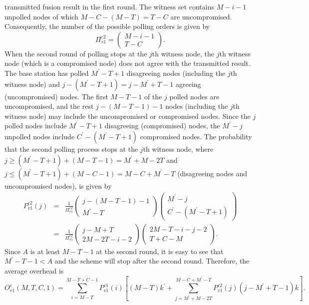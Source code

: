 \documentclass[12pt, onecolumn, draftcls]{IEEEtran}
\begin{document}
transmitted fusion result in the first round. The witness set
contains $M-i-1$ unpolled nodes of which $M-C-(M-T)=T-C$ are
uncompromised. Consequently, the number of the possible polling
orders is given by
\[
\Pi_{v1}^{c2} = \left(\begin{array}{c} M-i-1 \\ T-C
\end{array}\right).
\]
When the second round of polling stops at the $j$th witness node,
the $j$th witness node (which is a compromised node) does not agree
with the transmitted result. The base station has polled
$M^{\prime}-T+1$ disagreeing nodes (including the $j$th witness
node) and $j-(M^{\prime}-T+1)=j-M^{\prime}+T-1$ agreeing
(uncompromised) nodes. The first $M-T-1$ of the $j$ polled nodes are
uncompromised, and the rest $j-(M-T-1)-1$ nodes (including the $j$th
witness node) may include the uncompromised or compromised nodes.
Since the $j$ polled nodes include $M^{\prime}-T+1$ disagreeing
(compromised) nodes, the $M^{\prime}-j$ unpolled nodes include
$C^{\prime}-(M^{\prime}-T+1)$ compromised nodes. The probability
that the second polling process stops at the $j$th witness node,
where $j \ge (M^{\prime}-T+1)+(M-T-1)=M^{\prime}+M-2T$ and $j \le
(M^{\prime}-T+1) + (M-C-1) = M-C+ M^{\prime}-T$ (disagreeing nodes
and uncompromised nodes), is given by
\begin{eqnarray*}
P_{v1}^{c2}(j)&=&\frac{1}{\Pi_{v1}^{c2}}\left(\begin{array}{c} j-(M-T-1)-1 \\
M^{\prime}-T
\end{array}\right) \left(\begin{array}{c}  M^{\prime}-j \\
C^{\prime}-(M^{\prime}-T+1)
\end{array}\right) \nonumber \\
&=&\frac{1}{\Pi_{v1}^{c2}}\left(\begin{array}{c} j-M+T \\ 2M-2T-i-2
\end{array}\right) \left(\begin{array}{c}  2M-T-i-j-2 \\ T+C-M
\end{array}\right).
\end{eqnarray*}
Since $A$ is at least $M-T-1$ at the second round, it is easy to see
that $M^{\prime}-T-1<A$ and the scheme will stop after the second
round. Therefore, the average overhead is
\begin{equation}
O_{v1}^c(M,T,C,1) = \sum_{i=M-T}^{M-T+C-1} P_{v1}^{c1}(i)
\left[(M-T)k^{\prime} + \sum_{j=M^{\prime}+M-2T}^{M-C+
M^{\prime}-T}P_{v1}^{c2}(j) (j-M^{\prime}+T-1)k \right].
\label{eqn:polling_invalid_compromised_overhead}
\end{equation}
\end{document}
